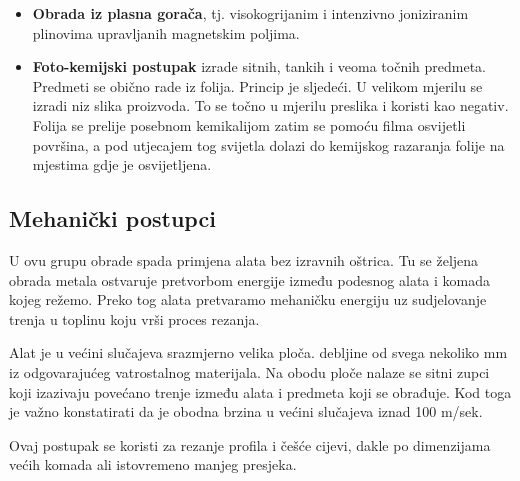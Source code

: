 \documentclass[a4paper,12pt]{article}
\numberwithin{figure}{section}
\begin{document}
\begin{enumerate}
\begin{itemize}
\item \textbf{Obrada iz plasna gorača}, tj. visokogrijanim i intenzivno joniziranim plinovima upravljanih magnetskim poljima.
\item \textbf{Foto-kemijski postupak} izrade sitnih, tankih i veoma točnih predmeta. Predmeti se obično rade iz folija. Princip je sljedeći. U velikom mjerilu se izradi niz slika proizvoda. To se točno u mjerilu preslika i koristi kao negativ. Folija se prelije posebnom kemikalijom zatim se pomoću filma osvijetli površina, a pod utjecajem tog svijetla dolazi do kemijskog razaranja folije na mjestima gdje je osvijetljena.
\end{itemize}
\end{enumerate}
\subsection{Mehanički postupci}
U ovu grupu obrade spada primjena alata bez izravnih oštrica. Tu se željena obrada metala ostvaruje pretvorbom energije između podesnog alata i komada kojeg režemo. Preko tog alata pretvaramo mehaničku energiju uz sudjelovanje trenja u toplinu koju vrši proces rezanja.\par
Alat je u većini slučajeva srazmjerno velika ploča. debljine od svega nekoliko mm iz odgovarajućeg vatrostalnog materijala. Na obodu ploče nalaze se sitni zupci koji izazivaju povećano trenje između alata i predmeta koji se obrađuje. Kod toga je važno konstatirati da je obodna brzina u većini slučajeva iznad 100 m/sek. \par
Ovaj postupak se koristi za rezanje profila i češće cijevi, dakle po dimenzijama većih komada ali istovremeno manjeg presjeka.
\end{document}
